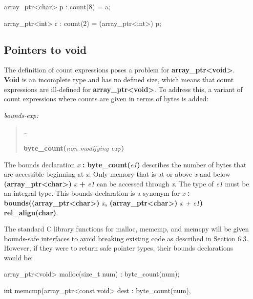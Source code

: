 \documentclass[]{article}
\begin{document}
array\_ptr\textless{}char\textgreater{} p : count(8) = a;

array\_ptr\textless{}int\textgreater{} r : count(2) =
(array\_ptr\textless{}int\textgreater{}) p;

\subsection{\texorpdfstring{\protect\hypertarget{ux5fRef436839461}{}{\protect\hypertarget{ux5fToc437460763}{}{\protect\hypertarget{ux5fToc440445441}{}{\protect\hypertarget{ux5fToc440449223}{}{\protect\hypertarget{ux5fToc440551873}{}{}}}}}Pointers
to void}{Pointers to void}}\label{pointers-to-void}

The definition of count expressions poses a problem for
\textbf{array\_ptr\textless{}void\textgreater{}}. \textbf{Void} is an
incomplete type and has no defined size, which means that count
expressions are ill-defined for
\textbf{array\_ptr\textless{}void\textgreater{}}. To address this, a
variant of count expressions where counts are given in terms of bytes is
added:

\emph{bounds-exp:}

\begin{quote}
\ldots{}

\textbf{byte\_count(}\emph{non-modifying-exp}\textbf{) }
\end{quote}

The bounds declaration \emph{x} \textbf{:
byte\_count(}\emph{e1}\textbf{)} describes the number of bytes that are
accessible beginning at \emph{x}. Only memory that is at or above
\emph{x} and below \textbf{(array\_ptr\textless{}char\textgreater{})}
\emph{x} \textbf{+} \emph{e1} can be accessed through \emph{x}. The type
of \emph{e1} must be an integral type. This bounds declaration is a
synonym for \emph{x} \textbf{:}
\textbf{bounds((array\_ptr\textless{}char\textgreater{})}
\emph{x}\textbf{, (array\_ptr\textless{}char\textgreater{})} \emph{x +
e1}\textbf{) rel\_align(char)}.

The standard C library functions for malloc, memcmp, and memcpy will be
given bounds-safe interfaces to avoid breaking existing code as
described in Section 6.3. However, if they were to return safe pointer
types, their bounds declarations would be:

array\_ptr\textless{}void\textgreater{} malloc(size\_t num) :
byte\_count(num);

int memcmp(array\_ptr\textless{}const void\textgreater{} dest :
byte\_count(num),
\end{document}

